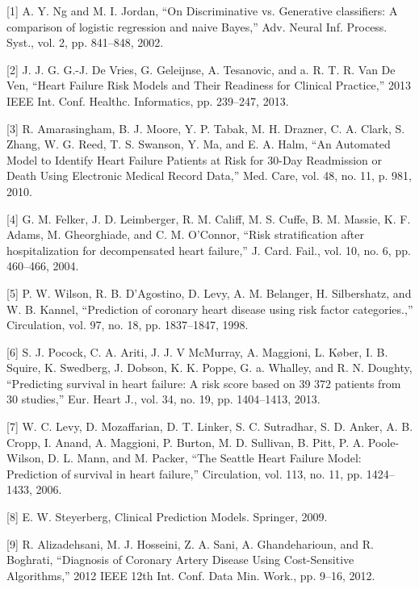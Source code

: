 \documentclass[a4paper,UKenglish]{oasics-v2016}
\begin{document}




[1]	A. Y. Ng and M. I. Jordan, “On Discriminative vs. Generative classifiers: A comparison of logistic regression and naive Bayes,” Adv. Neural Inf. Process. Syst., vol. 2, pp. 841–848, 2002.

[2]	J. J. G. G.-J. De Vries, G. Geleijnse, A. Tesanovic, and  a. R. T. R. Van De Ven, “Heart Failure Risk Models and Their Readiness for Clinical Practice,” 2013 IEEE Int. Conf. Healthc. Informatics, pp. 239–247, 2013.

[3]	R. Amarasingham, B. J. Moore, Y. P. Tabak, M. H. Drazner, C. A. Clark, S. Zhang, W. G. Reed, T. S. Swanson, Y. Ma, and E. A. Halm, “An Automated Model to Identify Heart Failure Patients at Risk for 30-Day Readmission or Death Using Electronic Medical Record Data,” Med. Care, vol. 48, no. 11, p. 981, 2010.

[4]	G. M. Felker, J. D. Leimberger, R. M. Califf, M. S. Cuffe, B. M. Massie, K. F. Adams, M. Gheorghiade, and C. M. O’Connor, “Risk stratification after hospitalization for decompensated heart failure,” J. Card. Fail., vol. 10, no. 6, pp. 460–466, 2004.

[5]	P. W. Wilson, R. B. D’Agostino, D. Levy, A. M. Belanger, H. Silbershatz, and W. B. Kannel, “Prediction of coronary heart disease using risk factor categories.,” Circulation, vol. 97, no. 18, pp. 1837–1847, 1998.

[6]	S. J. Pocock, C. A. Ariti, J. J. V McMurray, A. Maggioni, L. Køber, I. B. Squire, K. Swedberg, J. Dobson, K. K. Poppe, G. a. Whalley, and R. N. Doughty, “Predicting survival in heart failure: A risk score based on 39 372 patients from 30 studies,” Eur. Heart J., vol. 34, no. 19, pp. 1404–1413, 2013.

[7]	W. C. Levy, D. Mozaffarian, D. T. Linker, S. C. Sutradhar, S. D. Anker, A. B. Cropp, I. Anand, A. Maggioni, P. Burton, M. D. Sullivan, B. Pitt, P. A. Poole-Wilson, D. L. Mann, and M. Packer, “The Seattle Heart Failure Model: Prediction of survival in heart failure,” Circulation, vol. 113, no. 11, pp. 1424–1433, 2006.

[8]	E. W. Steyerberg, Clinical Prediction Models. Springer, 2009.

[9]	R. Alizadehsani, M. J. Hosseini, Z. A. Sani, A. Ghandeharioun, and R. Boghrati, “Diagnosis of Coronary Artery Disease Using Cost-Sensitive Algorithms,” 2012 IEEE 12th Int. Conf. Data Min. Work., pp. 9–16, 2012.
\end{document}
